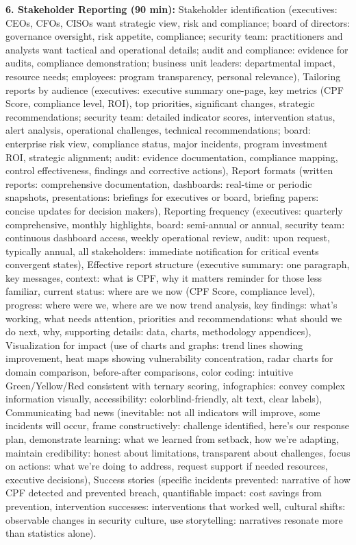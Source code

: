 \documentclass[11pt,a4paper]{article}
\begin{document}
\textbf{6. Stakeholder Reporting (90 min):} Stakeholder identification (executives: CEOs, CFOs, CISOs want strategic view, risk and compliance; board of directors: governance oversight, risk appetite, compliance; security team: practitioners and analysts want tactical and operational details; audit and compliance: evidence for audits, compliance demonstration; business unit leaders: departmental impact, resource needs; employees: program transparency, personal relevance), Tailoring reports by audience (executives: executive summary one-page, key metrics (CPF Score, compliance level, ROI), top priorities, significant changes, strategic recommendations; security team: detailed indicator scores, intervention status, alert analysis, operational challenges, technical recommendations; board: enterprise risk view, compliance status, major incidents, program investment ROI, strategic alignment; audit: evidence documentation, compliance mapping, control effectiveness, findings and corrective actions), Report formats (written reports: comprehensive documentation, dashboards: real-time or periodic snapshots, presentations: briefings for executives or board, briefing papers: concise updates for decision makers), Reporting frequency (executives: quarterly comprehensive, monthly highlights, board: semi-annual or annual, security team: continuous dashboard access, weekly operational review, audit: upon request, typically annual, all stakeholders: immediate notification for critical events convergent states), Effective report structure (executive summary: one paragraph, key messages, context: what is CPF, why it matters reminder for those less familiar, current status: where are we now (CPF Score, compliance level), progress: where were we, where are we now trend analysis, key findings: what's working, what needs attention, priorities and recommendations: what should we do next, why, supporting details: data, charts, methodology appendices), Visualization for impact (use of charts and graphs: trend lines showing improvement, heat maps showing vulnerability concentration, radar charts for domain comparison, before-after comparisons, color coding: intuitive Green/Yellow/Red consistent with ternary scoring, infographics: convey complex information visually, accessibility: colorblind-friendly, alt text, clear labels), Communicating bad news (inevitable: not all indicators will improve, some incidents will occur, frame constructively: challenge identified, here's our response plan, demonstrate learning: what we learned from setback, how we're adapting, maintain credibility: honest about limitations, transparent about challenges, focus on actions: what we're doing to address, request support if needed resources, executive decisions), Success stories (specific incidents prevented: narrative of how CPF detected and prevented breach, quantifiable impact: cost savings from prevention, intervention successes: interventions that worked well, cultural shifts: observable changes in security culture, use storytelling: narratives resonate more than statistics alone).
\end{document}
